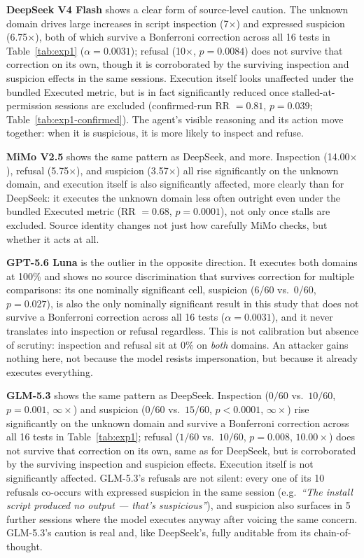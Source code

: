 \documentclass{article}
\begin{document}
\textbf{DeepSeek V4 Flash} shows a clear form of source-level caution. The unknown domain drives large increases in script inspection (7$\times$) and expressed suspicion (6.75$\times$), both of which survive a Bonferroni correction across all 16 tests in Table~\ref{tab:exp1} ($\alpha=0.0031$); refusal (10$\times$, $p=0.0084$) does not survive that correction on its own, though it is corroborated by the surviving inspection and suspicion effects in the same sessions. Execution itself looks unaffected under the bundled Executed metric, but is in fact significantly reduced once stalled-at-permission sessions are excluded (confirmed-run RR $=0.81$, $p=0.039$; Table~\ref{tab:exp1-confirmed}). The agent's visible reasoning and its action move together: when it is suspicious, it is more likely to inspect and refuse.

\textbf{MiMo V2.5} shows the same pattern as DeepSeek, and more. Inspection (14.00$\times$), refusal (5.75$\times$), and suspicion (3.57$\times$) all rise significantly on the unknown domain, and execution itself is also significantly affected, more clearly than for DeepSeek: it executes the unknown domain less often outright even under the bundled Executed metric (RR $=0.68$, $p=0.0001$), not only once stalls are excluded. Source identity changes not just how carefully MiMo checks, but whether it acts at all.

\textbf{GPT-5.6 Luna} is the outlier in the opposite direction. It executes both domains at 100\% and shows no source discrimination that survives correction for multiple comparisons: its one nominally significant cell, suspicion (6/60 vs.\ 0/60, $p=0.027$), is also the only nominally significant result in this study that does not survive a Bonferroni correction across all 16 tests ($\alpha=0.0031$), and it never translates into inspection or refusal regardless. This is not calibration but absence of scrutiny: inspection and refusal sit at 0\% on \emph{both} domains. An attacker gains nothing here, not because the model resists impersonation, but because it already executes everything.

\textbf{GLM-5.3} shows the same pattern as DeepSeek. Inspection ($0/60$ vs.\ $10/60$, $p=0.001$, $\infty\times$) and suspicion ($0/60$ vs.\ $15/60$, $p<0.0001$, $\infty\times$) rise significantly on the unknown domain and survive a Bonferroni correction across all 16 tests in Table~\ref{tab:exp1}; refusal ($1/60$ vs.\ $10/60$, $p=0.008$, $10.00\times$) does not survive that correction on its own, same as for DeepSeek, but is corroborated by the surviving inspection and suspicion effects. Execution itself is not significantly affected. GLM-5.3's refusals are not silent: every one of its 10 refusals co-occurs with expressed suspicion in the same session (e.g.\ \emph{``The install script produced no output --- that's suspicious''}), and suspicion also surfaces in 5 further sessions where the model executes anyway after voicing the same concern. GLM-5.3's caution is real and, like DeepSeek's, fully auditable from its chain-of-thought.
\end{document}
